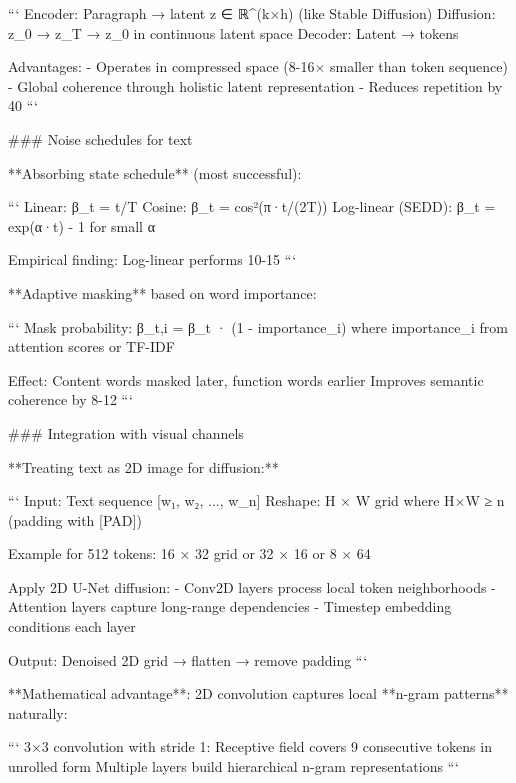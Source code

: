 \documentclass[11pt]{article}
\begin{document}
```
Encoder: Paragraph → latent z ∈ ℝ^(k×h) (like Stable Diffusion)
Diffusion: z_0 → z_T → z_0 in continuous latent space
Decoder: Latent → tokens

Advantages:
- Operates in compressed space (8-16× smaller than token sequence)
- Global coherence through holistic latent representation
- Reduces repetition by 40%
```

### Noise schedules for text

**Absorbing state schedule** (most successful):

```
Linear: β_t = t/T
Cosine: β_t = cos²(π·t/(2T))
Log-linear (SEDD): β_t = exp(α·t) - 1 for small α

Empirical finding: Log-linear performs 10-15%
```

**Adaptive masking** based on word importance:

```
Mask probability: β_t,i = β_t · (1 - importance_i)
where importance_i from attention scores or TF-IDF

Effect: Content words masked later, function words earlier
Improves semantic coherence by 8-12%
```

### Integration with visual channels

**Treating text as 2D image for diffusion:**

```
Input: Text sequence [w₁, w₂, ..., w_n]
Reshape: H × W grid where H×W ≥ n (padding with [PAD])

Example for 512 tokens:
16 × 32 grid or 32 × 16 or 8 × 64

Apply 2D U-Net diffusion:
- Conv2D layers process local token neighborhoods
- Attention layers capture long-range dependencies
- Timestep embedding conditions each layer

Output: Denoised 2D grid → flatten → remove padding
```

**Mathematical advantage**: 2D convolution captures local **n-gram patterns** naturally:

```
3×3 convolution with stride 1:
Receptive field covers 9 consecutive tokens in unrolled form
Multiple layers build hierarchical n-gram representations
```
\end{document}
